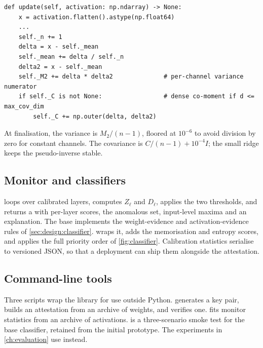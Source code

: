 \begin{lstlisting}[caption={Welford update (\code{detection/statistics.py}), after the fix of \cref{sec:impl:bugs}.},label={lst:welford}]
def update(self, activation: np.ndarray) -> None:
    x = activation.flatten().astype(np.float64)
    ...
    self._n += 1
    delta = x - self._mean
    self._mean += delta / self._n
    delta2 = x - self._mean
    self._M2 += delta * delta2              # per-channel variance numerator
    if self._C is not None:                 # dense co-moment if d <= max_cov_dim
        self._C += np.outer(delta, delta2)
\end{lstlisting}

At finalisation, the variance is $M_2/(n-1)$, floored at $10^{-6}$ to avoid division by zero for
constant channels. The covariance is $C/(n-1)+10^{-4}I$; the small ridge keeps the
pseudo-inverse stable.

\subsection{Monitor and classifiers}

 loops over calibrated layers, computes $Z_\ell$ and
$D_\ell$, applies the two thresholds, and returns a  with per-layer scores,
the anomalous set, input-level maxima and an explanation. The base 
implements the weight-evidence and activation-evidence rules of \cref{sec:design:classifier}.
 wraps it, adds the memorisation and entropy scores, and applies the full
priority order of \cref{fig:classifier}. Calibration statistics serialise to versioned JSON, so
that a deployment can ship them alongside the attestation.

\subsection{Command-line tools}

Three scripts wrap the library for use outside Python.  generates a key
pair, builds an attestation from an  archive of weights, and verifies one.
 fits monitor statistics from an archive of activations.  is
a three-scenario smoke test for the base classifier, retained from the initial prototype. The
experiments in \cref{ch:evaluation} use  instead.


